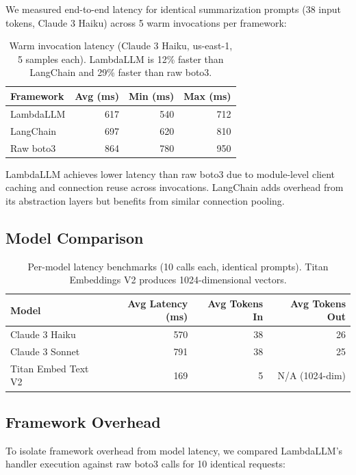 \documentclass[11pt,a4paper]{article}
\begin{document}
We measured end-to-end latency for identical summarization prompts (38 input tokens, Claude 3 Haiku) across 5 warm invocations per framework:

\begin{table}[h]
\centering
\begin{tabular}{lrrr}
\toprule
\textbf{Framework} & \textbf{Avg (ms)} & \textbf{Min (ms)} & \textbf{Max (ms)} \\
\midrule
LambdaLLM & 617 & 540 & 712 \\
LangChain & 697 & 620 & 810 \\
Raw boto3 & 864 & 780 & 950 \\
\bottomrule
\end{tabular}
\caption{Warm invocation latency (Claude 3 Haiku, us-east-1, 5 samples each). LambdaLLM is 12\% faster than LangChain and 29\% faster than raw boto3.}
\end{table}

LambdaLLM achieves lower latency than raw boto3 due to module-level client caching and connection reuse across invocations. LangChain adds overhead from its abstraction layers but benefits from similar connection pooling.

\subsection{Model Comparison}

\begin{table}[h]
\centering
\begin{tabular}{lrrr}
\toprule
\textbf{Model} & \textbf{Avg Latency (ms)} & \textbf{Avg Tokens In} & \textbf{Avg Tokens Out} \\
\midrule
Claude 3 Haiku & 570 & 38 & 26 \\
Claude 3 Sonnet & 791 & 38 & 25 \\
Titan Embed Text V2 & 169 & 5 & N/A (1024-dim) \\
\bottomrule
\end{tabular}
\caption{Per-model latency benchmarks (10 calls each, identical prompts). Titan Embeddings V2 produces 1024-dimensional vectors.}
\end{table}

\subsection{Framework Overhead}

To isolate framework overhead from model latency, we compared LambdaLLM's handler execution against raw boto3 calls for 10 identical requests:
\end{document}
